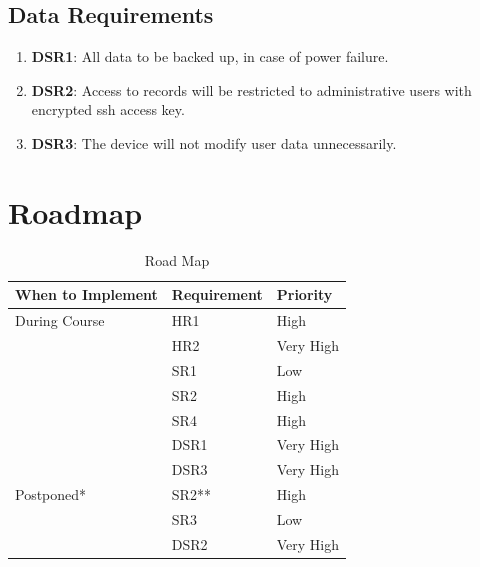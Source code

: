 \documentclass{article}
\begin{document}
\subsection{Data Requirements }
\begin{enumerate}
	\item\label{DSR1}\textbf{DSR1}: All data to be backed up, in case of power failure.\\

	\item\label{DSR2}\textbf{DSR2}: 	Access to records will be restricted to administrative users with encrypted ssh access key.\\
	\item\label{DSR3}\textbf{DSR3}: 	The device will not modify user data unnecessarily.\\ 	

\end{enumerate}


\pagebreak
\section{Roadmap}
\begin{table}[H]
	\caption{Road Map} \label{RoadMap}
	\begin{tabularx}{\textwidth}{llX}
		\toprule
		\textbf{When to Implement} & \textbf{Requirement} & \textbf{Priority}        \\
		\midrule
		During Course         	& HR1               	& High			\\
		         			& HR2              		& Very High 				\\
		          			& SR1                   	& Low                   	     \\
		          			& SR2     			& High                   	     \\
		          			& SR4                   	& High                   	     \\

		          			& DSR1                  	& Very High                   	     \\
		          			& DSR3                   & Very High                   	     \\

		Postponed*		& SR2** 			& High                               \\
						& SR3 			& Low                               \\
						& DSR2 			& Very High                               \\
		\bottomrule
	\end{tabularx}
\end{table}
\end{document}
